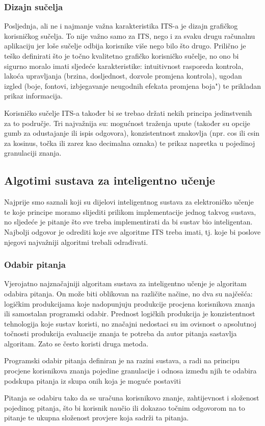 \documentclass[times, utf8, zavrsni]{fer}
\begin{document}
\subsubsection{Dizajn sučelja}
Posljednja, ali ne i najmanje važna karakteristika ITS-a je dizajn grafičkog korisničkog sučelja. To nije važno samo za ITS, nego i za svaku drugu računalnu aplikaciju jer loše sučelje odbija korisnike više nego bilo što drugo. Prilično je teško definirati što je točno kvalitetno grafičko korisničko sučelje, no ono bi sigurno moralo imati sljedeće karakteristike: intuitivnost rasporeda kontrola, lakoća upravljanja (brzina, dosljednost, dozvole promjena kontrola), ugodan izgled (boje, fontovi, izbjegavanje neugodnih efekata promjena boja") te prikladan prikaz informacija.
\par
Korisničko sučelje ITS-a također bi se trebao držati nekih principa jedinstvenih za to područje. Tri najvažnija su: mogućnost traženja upute (također su opcije gumb za odustajanje ili ispis odgovora), konzistentnost znakovlja (npr. cos ili csin za kosinus, točka ili zarez kao decimalna oznaka) te prikaz napretka u pojedinoj granulaciji znanja.

\subsection{Algotimi sustava za inteligentno učenje}

Najprije smo saznali koji su dijelovi inteligentnog sustava za elektroničko učenje te koje principe moramo slijediti prilikom implementacije jednog takvog sustava, no sljedeće je pitanje što sve treba implementirati da bi sustav bio inteligentan. Najbolji odgovor je odrediti koje sve algoritme ITS treba imati, tj. koje bi poslove njegovi najvažniji algoritmi trebali odrađivati.

\subsubsection{Odabir pitanja}
Vjerojatno najznačajniji algoritam sustava za inteligentno učenje je algoritam odabira pitanja. On može biti oblikovan na različite načine, no dva su najčešća: logičkim produkcijama koje nadopunjuju produkcije procjena korisnikova znanja ili samostalan programski odabir. Prednost logičkih produkcija je konzistentnost tehnologija koje sustav koristi, no značajni nedostaci su im ovisnost o apsolutnoj točnosti produkcija evaluacije znanja te potreba da autor pitanja sastavlja algoritam. Zato se često koristi druga metoda.
\par
Programski odabir pitanja definiran je na razini sustava, a radi na principu procjene korisnikova znanja pojedine granulacije i odnosa između njih te odabira podskupa pitanja iz skupa onih koja je moguće postaviti
\par
Pitanja se odabiru tako da se uračuna korisnikovo znanje, zahtijevnost i složenost pojedinog pitanja, što bi korisnik naučio ili dokazao točnim odgovorom na to pitanje te ukupna složenost provjere koja sadrži ta pitanja.
\end{document}
